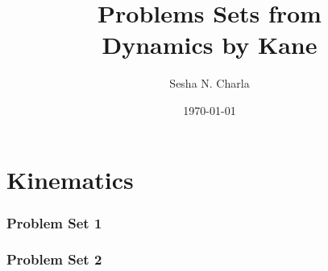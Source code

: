 \documentclass[letterpaper, 11pt]{article}
\title{Problems Sets from\\Dynamics by Kane}
\author{Sesha N. Charla}
\date{\today}
\begin{document}
\maketitle
\tableofcontents
\newpage
\part{Kinematics}
\section{Problem Set 1}








\newpage
\section{Problem Set 2}









\newpage
\end{document}
